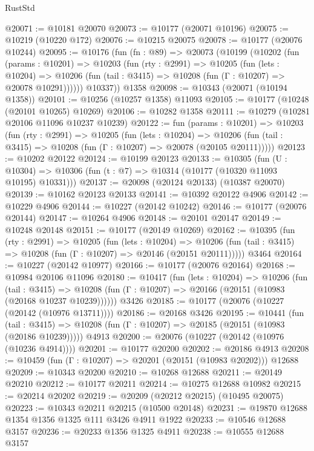 \begin{lexlean}{RustStd}
\begin{coremodule}
@20071 := @10181 @20070
@20073 := @10177 (@20071 @10196)
@20075 := @10219 (@10220 @172)
@20076 := @10215 @20075
@20078 := @10177 (@20076 @10244)
@20095 := @10176
    (fun (fn : @89) =>
    @20073
      (@10199
        (@10202
          (fun (params : @10201) =>
          @10203
            (fun (rty : @2991) =>
            @10205
              (fun (lets : @10204) =>
              @10206 (fun (tail : @3415) => @10208 (fun (Γ : @10207) => @20078 @10291))))))
        @10337))
    @1358
@20098 := @10343 (@20071 (@10194 @1358))
@20101 := @10256 (@10257 @1358) @11093
@20105 := @10177 (@10248 (@20101 @10265) @10269)
@20106 := @10282 @1358
@20111 := @10279 (@10281 @20106 @11096 @10237 @10239)
@20122 := fun (params : @10201) =>
  @10203
    (fun (rty : @2991) =>
    @10205
      (fun (lets : @10204) =>
      @10206 (fun (tail : @3415) => @10208 (fun (Γ : @10207) => @20078 (@20105 @20111)))))
@20123 := @10202 @20122
@20124 := @10199 @20123
@20133 := @10305
    (fun (U : @10304) => @10306 (fun (t : @7) => @10314 (@10177 (@10320 @11093 @10195) @10331)))
@20137 := @20098 (@20124 @20133) (@10387 @20070)
@20139 := @10162 @20123 @20133
@20141 := @10392 @20122 @4906
@20142 := @10229 @4906
@20144 := @10227 (@20142 @10242)
@20146 := @10177 (@20076 @20144)
@20147 := @10264 @4906
@20148 := @20101 @20147
@20149 := @10248 @20148
@20151 := @10177 (@20149 @10269)
@20162 := @10395
    (fun (rty : @2991) =>
    @10205
      (fun (lets : @10204) =>
      @10206 (fun (tail : @3415) => @10208 (fun (Γ : @10207) => @20146 (@20151 @20111)))))
    @3464
@20164 := @10227 (@20142 @10977)
@20166 := @10177 (@20076 @20164)
@20168 := @10984 @20106 @11096
@20180 := @10417
    (fun (lets : @10204) =>
    @10206
      (fun (tail : @3415) =>
      @10208 (fun (Γ : @10207) => @20166 (@20151 (@10983 (@20168 @10237 @10239))))))
    @3426
@20185 := @10177 (@20076 (@10227 (@20142 (@10976 @13711))))
@20186 := @20168 @3426
@20195 := @10441
    (fun (tail : @3415) => @10208 (fun (Γ : @10207) => @20185 (@20151 (@10983 (@20186 @10239)))))
    @4913
@20200 := @20076 (@10227 (@20142 (@10976 (@10236 @4914))))
@20201 := @10177 @20200
@20202 := @20186 @4913
@20208 := @10459 (fun (Γ : @10207) => @20201 (@20151 (@10983 @20202))) @12688
@20209 := @10343 @20200
@20210 := @10268 @12688
@20211 := @20149 @20210
@20212 := @10177 @20211
@20214 := @10275 @12688 @10982
@20215 := @20214 @20202
@20219 := @20209 (@20212 @20215) (@10495 @20075)
@20223 := @10343 @20211 @20215 (@10500 @20148)
@20231 := @19870 @12688 @1354 @1356 @1325 @111 @3426 @4911 @1922
@20233 := @10546 @12688 @3157
@20236 := @20233 @1356 @1325 @4911
@20238 := @10555 @12688 @3157

\end{coremodule}
\end{lexlean}
